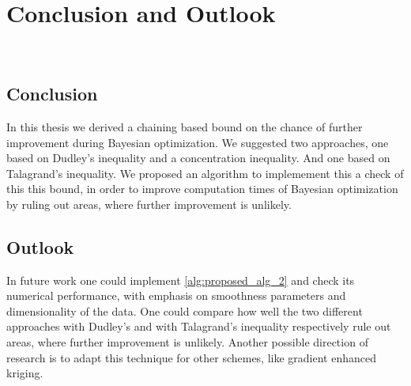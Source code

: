 \chapter{Conclusion and Outlook}~\label{chap:conclusion_outlook}
%
%
\section{Conclusion}
In this thesis we derived a chaining based bound on the chance of further improvement during Bayesian optimization. 
We suggested two approaches, one based on Dudley's inequality and a concentration inequality. And one based on Talagrand's inequality.
We proposed an algorithm to implemement this a check of this this bound, in order to improve computation times of Bayesian optimization by ruling out areas, where further improvement is unlikely.
%
%
\section{Outlook}
In future work one could implement \cref{alg:proposed_alg_2} and check its numerical performance, with emphasis on smoothness parameters and dimensionality of the data. One could compare how well the two different approaches with Dudley's and with Talagrand's inequality respectively rule out areas, where further improvement is unlikely.
Another possible direction of research is to adapt this technique for other schemes, like gradient enhanced kriging.
